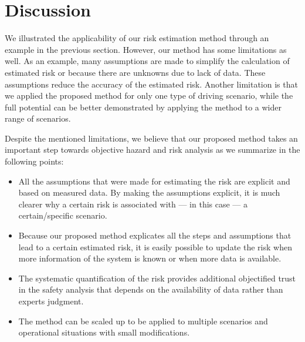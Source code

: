 \section{Discussion} %
\label{sec:discussion}



We illustrated the applicability of our risk estimation method through an example in the previous section. 
However, our method has some limitations as well. 
As an example, many assumptions are made to simplify the calculation of estimated risk or because there are unknowns due to lack of data. These assumptions reduce the accuracy of the estimated risk. 
Another limitation is that we applied the proposed method for only one type of driving scenario, while the full potential can be better demonstrated by applying the method to a wider range of scenarios.

Despite the mentioned limitations, we believe that our proposed method  takes an important step towards objective hazard and risk analysis as we summarize in the following points: 
\begin{itemize}
	\item All the assumptions that were made for estimating the risk are explicit and based on measured data. By making the assumptions explicit, it is much clearer why a certain risk is associated with --- in this case --- a certain/specific scenario.
	\item Because our proposed method explicates all the steps and assumptions that lead to a certain estimated risk, it is easily possible to update the risk when more information of the system is known or when more data is available.
	\item The systematic quantification of the risk provides additional objectified trust in the safety analysis that depends on the availability of data rather than experts judgment. 
	\item The method can be scaled up to be applied to multiple scenarios and operational situations with small modifications. 
\end{itemize}





